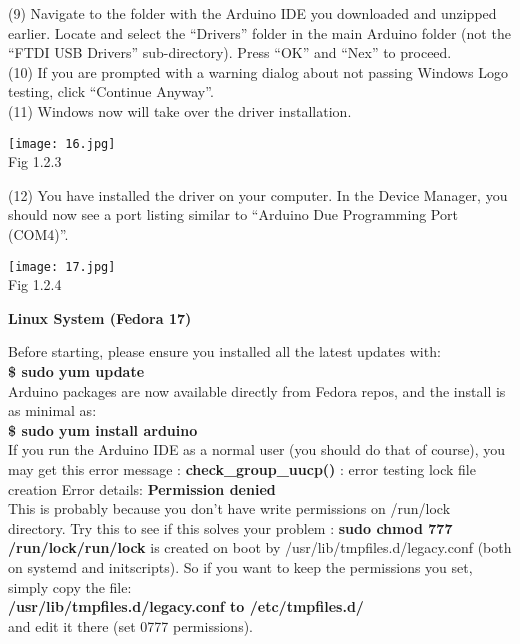 \documentclass[12pt]{report}
\begin{document}
\textup{(9) Navigate to the folder with the Arduino IDE you downloaded and unzipped earlier. Locate and select the ``Drivers'' folder in the main Arduino folder (not the ``FTDI USB Drivers'' sub-directory). Press ``OK'' and ``Nex'' to proceed.\\(10) If you are prompted with a warning dialog about not passing Windows Logo testing, click ``Continue Anyway''.\\(11) Windows now will take over the driver installation.}
\begin{center}
\texttt{[image: 16.jpg]}\\
\textup{\footnotesize Fig 1.2.3}
\end{center}
\textup{(12) You have installed the driver on your computer. In the Device Manager, you should now see a port listing similar to ``Arduino Due Programming Port (COM4)''.}
\begin{center}
\texttt{[image: 17.jpg]}\\
\textup{\footnotesize Fig 1.2.4}
\end{center}
\newpage
\begin{flushleft}
\textbf{Linux System (Fedora 17)}
\end{flushleft}
\textup{Before starting, please ensure you installed all the latest updates with: \\}
\textbf{\$ sudo yum update\\}
\textup{Arduino packages are now available directly from Fedora repos, and the install is as minimal as:\\}
\textbf{\$ sudo yum install arduino\\}
\textup{If you run the Arduino IDE as a normal user (you should do that of course), you may get this error message :}
\textbf{check\_group\_uucp()}
\textup{: error testing lock file creation Error details:}
\textbf{Permission denied\\}
\textup{This is probably because you don't have write permissions on /run/lock directory. Try this to see if this solves your problem :}
\textbf{sudo chmod 777 /run/lock/run/lock }
\textup{is created on boot by /usr/lib/tmpfiles.d/legacy.conf (both on systemd and initscripts). So if you want to keep the permissions you set, simply copy the file:\\}
\textbf{/usr/lib/tmpfiles.d/legacy.conf to /etc/tmpfiles.d/}\\
\textup{and edit it there (set 0777 permissions).}
\end{document}
